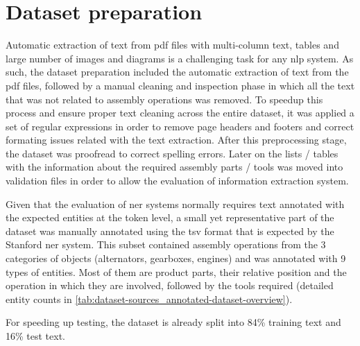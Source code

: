 \section{Dataset preparation}\label{sec:dataset-preparation}

Automatic extraction of text from \gls{pdf} files with multi-column text, tables and large number of images and diagrams is a challenging task for any \gls{nlp} system. As such, the dataset preparation included the automatic extraction of text from the \gls{pdf} files, followed by a manual cleaning and inspection phase in which all the text that was not related to assembly operations was removed. To speedup this process and ensure proper text cleaning across the entire dataset, it was applied a set of regular expressions in order to remove page headers and footers and correct formating issues related with the text extraction. After this preprocessing stage, the dataset was proofread to correct spelling errors. Later on the lists / tables with the information about the required assembly parts / tools was moved into validation files in order to allow the evaluation of information extraction system.

Given that the evaluation of \gls{ner} systems normally requires text annotated with the expected entities at the token level, a small yet representative part of the dataset was manually annotated using the \gls{tsv} format that is expected by the Stanford \gls{ner} system. This subset contained assembly operations from the 3 categories of objects (alternators, gearboxes, engines) and was annotated with 9 types of entities. Most of them are product parts, their relative position and the operation in which they are involved, followed by the tools required (detailed entity counts in \cref{tab:dataset-sources_annotated-dataset-overview}).

For speeding up testing, the dataset is already split into 84\% training text and 16\% test text.

